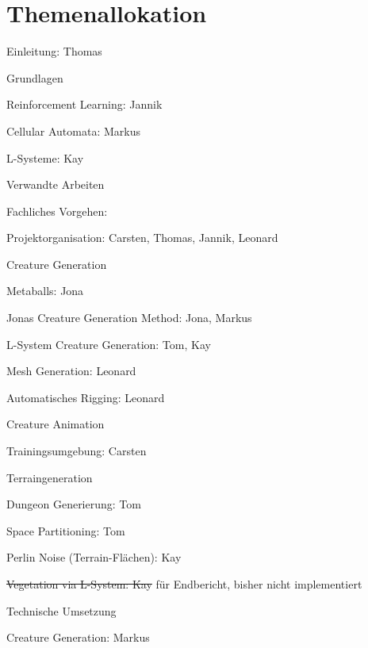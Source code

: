 \chapter*{Themenallokation}

\begin{thallok}
	\item Einleitung: Thomas
	\item Grundlagen
	\begin{thallok}
		\item Reinforcement Learning: Jannik
		\item Cellular Automata: Markus
		\item L-Systeme: Kay
	\end{thallok}
	\item Verwandte Arbeiten
	\item Fachliches Vorgehen:
	\begin{thallok}
		\item Projektorganisation: Carsten, Thomas, Jannik, Leonard
		\item Creature Generation
		\begin{thallok}
			\item Metaballs: Jona
			\item Jonas Creature Generation Method: Jona, Markus
			\item L-System Creature Generation: Tom, Kay
			\item Mesh Generation: Leonard
			\item Automatisches Rigging: Leonard
		\end{thallok}
		\item Creature Animation
		\begin{thallok}
			\item Trainingsumgebung: Carsten
		\end{thallok}
		\item Terraingeneration
		\begin{thallok}
			\item Dungeon Generierung: Tom
			\item Space Partitioning: Tom
			\item Perlin Noise (Terrain-Flächen): Kay
			\item \sout{Vegetation via L-System: Kay} für Endbericht, bisher nicht implementiert
		\end{thallok}
	\end{thallok}
	\item Technische Umsetzung
	\begin{thallok}
		\item Creature Generation: Markus

\end{thallok}
\end{thallok}

